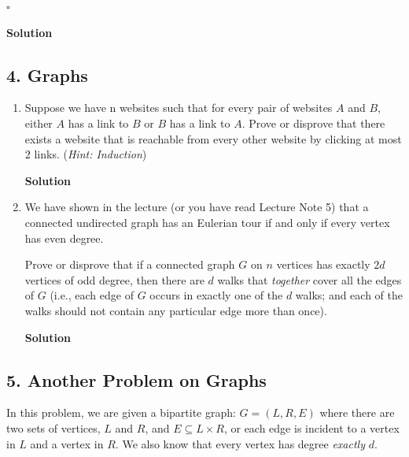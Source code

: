 \documentclass{article}
\newcommand*{\QEDB}{\hfill\ensuremath{\square}}
\begin{document}
\QEDB
\begin{mdframed}
\textbf{Solution}

\end{mdframed}

\clearpage

\subsection*{4. Graphs}
\begin{enumerate}
\item Suppose we have n websites such that for every pair of websites $A$ and $B$, either $A$ has a link to $B$ or $B$ has a link to $A$. Prove or disprove that there exists a website that is reachable from every other website by clicking at most $2$ links. (\textit{Hint: Induction})
\begin{mdframed}
\textbf{Solution}

\end{mdframed}
\item We have shown in the lecture (or you have read Lecture Note 5) that a connected undirected graph has an Eulerian tour if and only if every vertex has even degree. 

Prove or disprove that if a connected graph $G$ on $n$ vertices has exactly $2d$ vertices of odd degree, then there are $d$ walks that \textit{together} cover all the edges of $G$ (i.e., each edge of $G$ occurs in exactly one of the $d$ walks; and each of the walks should not contain any particular edge more than once).
\begin{mdframed}
\textbf{Solution}

\end{mdframed}
\end{enumerate}
\clearpage

\subsection*{5. Another Problem on Graphs}
In this problem, we are given a bipartite graph: $G=(L,R,E)$ where there are two sets of vertices, $L$ and $R$, and $E\subseteq L\times R$, or each edge is incident to a vertex in $L$ and a vertex in $R$. We also know that every vertex has degree \textit{exactly} $d$.
\end{document}
